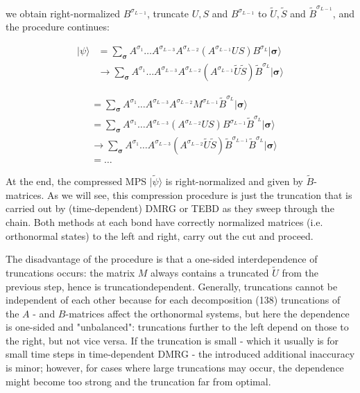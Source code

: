 \documentclass[12pt]{article}
\begin{document}
we obtain right-normalized $B^{\sigma_{L-1}}$, truncate $U, S$ and $B^{\sigma_{L-1}}$ to $\tilde{U}, \tilde{S}$ and $\tilde{B}^{\sigma_{L-1}}$, and the procedure continues:

$$
\begin{aligned}
|\psi\rangle & =\sum_{\boldsymbol{\sigma}} A^{\sigma_{1}} \ldots A^{\sigma_{L-3}} A^{\sigma_{L-2}}\left(A^{\sigma_{L-1}} U S\right) B^{\sigma_{L}}|\boldsymbol{\sigma}\rangle \\
& \rightarrow \sum_{\boldsymbol{\sigma}} A^{\sigma_{1}} \ldots A^{\sigma_{L-3}} A^{\sigma_{L-2}}\left(A^{\sigma_{L-1}} \tilde{U} \tilde{S}\right) \tilde{B}^{\sigma_{L}}|\boldsymbol{\sigma}\rangle
\end{aligned}
$$

$$
\begin{aligned}
& =\sum_{\boldsymbol{\sigma}} A^{\sigma_{1}} \ldots A^{\sigma_{L-3}} A^{\sigma_{L-2}} M^{\sigma_{L-1}} \tilde{B}^{\sigma_{L}}|\boldsymbol{\sigma}\rangle \\
& =\sum_{\boldsymbol{\sigma}} A^{\sigma_{1}} \ldots A^{\sigma_{L-3}}\left(A^{\sigma_{L-2}} U S\right) B^{\sigma_{L-1}} \tilde{B}^{\sigma_{L}}|\boldsymbol{\sigma}\rangle \\
& \rightarrow \sum_{\boldsymbol{\sigma}} A^{\sigma_{1}} \ldots A^{\sigma_{L-3}}\left(A^{\sigma_{L-2}} \tilde{U} \tilde{S}\right) \tilde{B}^{\sigma_{L-1}} \tilde{B}^{\sigma_{L}}|\boldsymbol{\sigma}\rangle \\
& =\ldots
\end{aligned}
$$

At the end, the compressed MPS $|\tilde{\psi}\rangle$ is right-normalized and given by $\tilde{B}$-matrices. As we will see, this compression procedure is just the truncation that is carried out by (time-dependent) DMRG or TEBD as they sweep through the chain. Both methods at each bond have correctly normalized matrices (i.e. orthonormal states) to the left and right, carry out the cut and proceed.

The disadvantage of the procedure is that a one-sided interdependence of truncations occurs: the matrix $M$ always contains a truncated $\tilde{U}$ from the previous step, hence is truncationdependent. Generally, truncations cannot be independent of each other because for each decomposition (138) truncations of the $A$ - and $B$-matrices affect the orthonormal systems, but here the dependence is one-sided and "unbalanced": truncations further to the left depend on those to the right, but not vice versa. If the truncation is small - which it usually is for small time steps in time-dependent DMRG - the introduced additional inaccuracy is minor; however, for cases where large truncations may occur, the dependence might become too strong and the truncation far from optimal.
\end{document}
